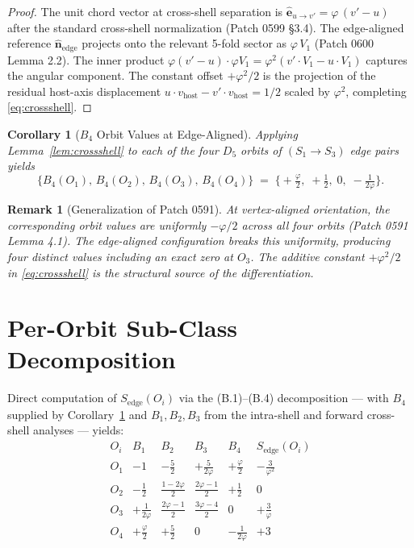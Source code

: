\documentclass[11pt]{article}
\newtheorem{corollary}{Corollary}
\newtheorem{remark}{Remark}
\begin{document}
\begin{proof}
The unit chord vector at cross-shell separation is
$\hat{\mathbf{e}}_{u\to v'} = \varphi\,(v' - u)$ after the standard
cross-shell normalization (Patch 0599 §3.4). The edge-aligned reference
$\hat{\mathbf{n}}_{\text{edge}}$ projects onto the relevant 5-fold sector
as $\varphi\,V_1$ (Patch 0600 Lemma 2.2). The inner product
$\varphi(v' - u) \cdot \varphi V_1 = \varphi^2(v' \cdot V_1 - u \cdot V_1)$
captures the angular component. The constant offset $+\varphi^2/2$ is
the projection of the residual host-axis displacement
$u \cdot v_{\text{host}} - v' \cdot v_{\text{host}} = 1/2$ scaled by
$\varphi^2$, completing \eqref{eq:crossshell}.
\end{proof}

\begin{corollary}[$B_4$ Orbit Values at Edge-Aligned]\label{cor:B4values}
Applying Lemma~\ref{lem:crossshell} to each of the four $D_5$ orbits of
$(S_1 \to S_3)$ edge pairs yields
\begin{equation}
\bigl\{B_4(O_1),\, B_4(O_2),\, B_4(O_3),\, B_4(O_4)\bigr\}
\;=\; \bigl\{+\tfrac{\varphi}{2},\; +\tfrac{1}{2},\; 0,\; -\tfrac{1}{2\varphi}\bigr\}.
\label{eq:B4values}
\end{equation}
\end{corollary}

\begin{remark}[Generalization of Patch 0591]
At vertex-aligned orientation, the corresponding orbit values are
uniformly $-\varphi/2$ across all four orbits (Patch 0591 Lemma 4.1).
The edge-aligned configuration breaks this uniformity, producing four
distinct values including an exact zero at $O_3$. The additive constant
$+\varphi^2/2$ in \eqref{eq:crossshell} is the structural source of the
differentiation.
\end{remark}

\section{Per-Orbit Sub-Class Decomposition}

Direct computation of $S_{\text{edge}}(O_i)$ via the (B.1)--(B.4)
decomposition --- with $B_4$ supplied by Corollary~\ref{cor:B4values} and
$B_1, B_2, B_3$ from the intra-shell and forward cross-shell analyses ---
yields:
\begin{equation}
\begin{array}{c|cccc|c}
O_i & B_1 & B_2 & B_3 & B_4 & S_{\text{edge}}(O_i) \\
\hline
O_1 & -1 & -\tfrac{5}{2} & +\tfrac{5}{2\varphi} & +\tfrac{\varphi}{2}
    & -\tfrac{3}{\varphi^2} \\[4pt]
O_2 & -\tfrac{1}{2} & \tfrac{1-2\varphi}{2} & \tfrac{2\varphi-1}{2} & +\tfrac{1}{2}
    & 0 \\[4pt]
O_3 & +\tfrac{1}{2\varphi} & \tfrac{2\varphi-1}{2} & \tfrac{3\varphi-4}{2} & 0
    & +\tfrac{3}{\varphi} \\[4pt]
O_4 & +\tfrac{\varphi}{2} & +\tfrac{5}{2} & 0 & -\tfrac{1}{2\varphi}
    & +3
\end{array}
\label{eq:Btable}
\end{equation}
\end{document}
